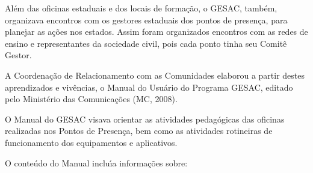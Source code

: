 \documentclass[
12pt,		%
openright,	%
twoside,  %
a4paper,			%
chapter=TITLE,		%
english,			%
french,				%
spanish,			%
brazil				%
]{USPSC-classe/USPSC}
\begin{document}
\noindent\begin{center}\mbox{\centering{}}\end{center}


Al\'em das oficinas estaduais e dos locais de forma\c{c}\~ao, o GESAC, tamb\'em, organizava encontros com os gestores estaduais dos pontos de presen\c{c}a, para planejar as a\c{c}\~oes nos estados. Assim foram organizados encontros com as redes de ensino e  representantes da sociedade civil, pois cada ponto  tinha seu Comit\^e Gestor.









A Coordena\c{c}\~ao de Relacionamento com as Comunidades elaborou a partir destes aprendizados e viv\^encias, o \textquotedbl Manual do Usu\'ario do Programa GESAC\textquotedbl , editado pelo Minist\'erio das Comunica\c{c}\~oes (MC, 2008).









O Manual do GESAC visava  orientar as atividades pedag\'ogicas das oficinas realizadas nos Pontos de Presen\c{c}a, bem como as  atividades rotineiras de funcionamento dos equipamentos e aplicativos.









O conte\'udo do Manual inclu\'{\i}a informa\c{c}\~oes sobre:
\end{document}
